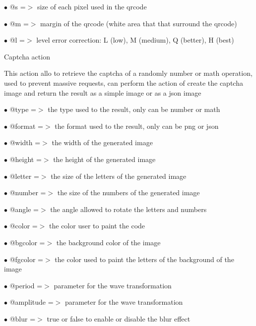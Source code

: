 \documentclass[a4paper]{article}
\begin{document}
\begin{compactitem}
\item[\color{myblue}$\bullet$] @s =$>$ size of each pixel used in the qrcode
\item[\color{myblue}$\bullet$] @m =$>$ margin of the qrcode (white area that that surround the qrcode)
\item[\color{myblue}$\bullet$] @l =$>$ level error correction: L (low), M (medium), Q (better), H (best)
\end{compactitem}

Captcha action

This action allo to retrieve the captcha of a randomly number or math
operation, used to prevent massive requests, can perform the action of
create the captcha image and return the result as a simple image or as
a json image

\begin{compactitem}
\item[\color{myblue}$\bullet$] @type   =$>$ the type used to the result, only can be number or math
\item[\color{myblue}$\bullet$] @format =$>$ the format used to the result, only can be png or json
\end{compactitem}

\begin{compactitem}
\item[\color{myblue}$\bullet$] @width     =$>$ the width of the generated image
\item[\color{myblue}$\bullet$] @height    =$>$ the height of the generated image
\item[\color{myblue}$\bullet$] @letter    =$>$ the size of the letters of the generated image
\item[\color{myblue}$\bullet$] @number    =$>$ the size of the numbers of the generated image
\item[\color{myblue}$\bullet$] @angle     =$>$ the angle allowed to rotate the letters and numbers
\item[\color{myblue}$\bullet$] @color     =$>$ the color user to paint the code
\item[\color{myblue}$\bullet$] @bgcolor   =$>$ the background color of the image
\item[\color{myblue}$\bullet$] @fgcolor   =$>$ the color used to paint the letters of the background of the image
\item[\color{myblue}$\bullet$] @period    =$>$ parameter for the wave transformation
\item[\color{myblue}$\bullet$] @amplitude =$>$ parameter for the wave transformation
\item[\color{myblue}$\bullet$] @blur      =$>$ true or false to enable or disable the blur effect
\end{compactitem}
\end{document}
